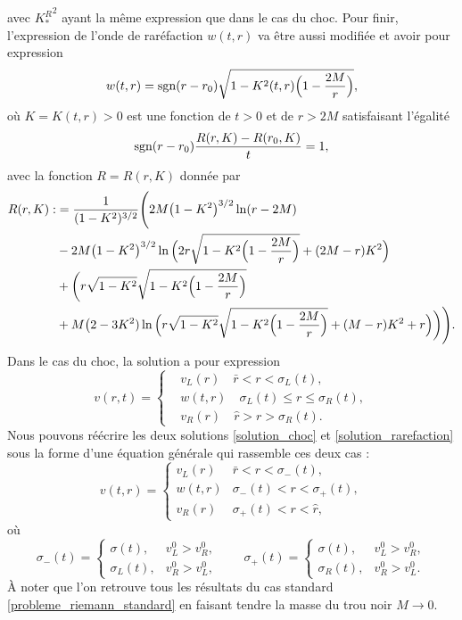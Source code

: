 \documentclass[11pt,a4paper]{article}
\begin{document}
avec ${K_*^R}^2$ ayant la même expression que dans le cas du choc.
Pour finir, l'expression de l'onde de raréfaction $w(t,r)$ va être aussi modifiée et avoir pour expression
\begin{equation}\label{curved-ra}
w(t, r) = \text{sgn}(r-r_0 )  \sqrt{{1} -K^2 (t,r ) \Big(1-{ 2M \over r}\Big)},  
\end{equation}
où $K  = K (t,r )>0 $  est une fonction de $t>0$ et de $r>2M$ satisfaisant l'égalité
\begin{equation}\label{K_*}
 \text{sgn}(r-r_0 )   {R(r, K)-R(r_0, K) \over t} =1, 
\end{equation}
avec la fonction $R= R(r, K)$ donnée par
\begin{equation}\label{Rcurve}
\aligned 
R(r, K): & ={1  \over (1 - K^2 )^{3/2}}  \Bigg (  2 M  \big({1}  - K^2\big)^{3/2} \ln (r- 2M )
\\  
& -2M  \big({1}  - K ^2\big)^{3/2} \ln \Big( {2 r}  \sqrt {{1}- K ^2 \Big(1- {2M\over r}\Big)} +( 2M-r) K ^2\Big )
\\
& 
+\bigg(r \sqrt {{1}  - K ^2}   \sqrt {{1}- K  ^2\Big(1- {2M\over r}\Big) } 
\\
& + M \big ({2} -3 K ^2 ) \ln \Big( r \sqrt {{1}- K ^2}   \sqrt {{1}- K ^2 \Big(1- {2M\over r}\Big)  } + ( M-r) K ^2+{r}  \Big )
 \bigg) 
 \Bigg). 
\endaligned 
\end{equation}
Dans le cas du choc, la solution a pour expression
\begin{equation}\label{solution_rarefaction}
	v(r,t) = \left\{
	\begin{aligned}
	             &v_L(r)\quad \bar{r} < r< \sigma_L(t),\\
	             & w(t,r) \quad\sigma_L(t) \leq r \leq \sigma_R(t),\\
			     &v_R(r)\quad \hat{r} > r > \sigma_R(t).
			     \end{aligned}
			\right.
\end{equation} 
Nous pouvons réécrire les deux solutions \eqref{solution_choc} et \eqref{solution_rarefaction} sous la forme d'une équation générale qui rassemble ces deux cas : 
 \begin{equation}\label{Riemann-sol}
v(t, r)= 
\begin{cases}
v_L(r)&  \bar r<r< \sigma_-( t) , \\ 
w(t,r) & \sigma_-(t) < r < \sigma_+(t),\\
v_R(r) &  \sigma_+ (t) < r <\hat r, 
\end{cases}
\end{equation}
où
\begin{equation}\label{region}
\sigma_-(t) = \begin{cases}
\sigma (t) ,  & v_L^0>v_R^0,\\
\sigma_ L (t),  & v_R^0>v_L^0, 
\end{cases} 
\qquad 
\sigma_+ (t)= \begin{cases}
\sigma (t) ,  & v_L^0>v_R^0,\\
\sigma_R  (t) ,  & v_R^0>v_L^0. 
\end{cases}
\end{equation}
\`{A} noter que l'on retrouve tous les résultats du cas standard \ref{probleme_riemann_standard} en faisant tendre la masse du trou noir $M\rightarrow 0$.
\end{document}
